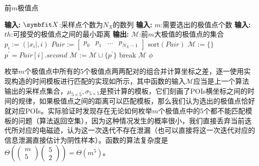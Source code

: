 {{	\begin{breakablealgorithm}
		\caption{前$m$极值点}\label{alg:maxpoint}
		\begin{algorithmic}[1]
			\Statex \textbf{输入:} $\Vector X$:采样点个数为$N_X$的数列
			\Statex \textbf{输入:} $m$:需要选出的极值点个数
			\Statex \textbf{输入:} $th$:可接受的极值点之间的最小距离
			\Statex \textbf{输出:} $\mathcal M$:前$m$大极值的极值点的集合
			\State $p_i:=(\vert x_i\vert,i)$
			\EndFor
			\State $Pair:=\begin{bmatrix}p_0&p_1&\ldots&p_{N_X-1}\end{bmatrix}$
			\State $\mathrm{sort}(Pair)$
			\State $\mathcal M:=\{\}$
			\State $p^\prime=Pair[i].second$
			\State $\mathcal M:=\mathcal M\cup\{p^\prime\}$
			\State break
			\EndIf
			\EndIf
			\EndFor
			\State \Return $\mathcal M$
			\Else
			\State \Return $\phi$
			\EndIf
		\end{algorithmic}
	\end{breakablealgorithm}
	
	枚举$m$个极值点中所有的5个极值点两两配对的组合并计算坐标之差，逐一使用实现构造的时间模板进行匹配的实现如所示，其中函数的输入$\mathcal M$应当是上一个算法输出的采样点集合，$\mu_{5\times5},\sigma_{5\times5}$是预计算的模板，它们刻画了POIs横坐标之间的时间的规律，如果极值点之间的距离可以匹配模板，那么我们认为选出的极值点恰好就对应POIs。实际验证时发现存在无论如何枚举$m$个极值点中的5个都不能匹配模板的问题（算法返回空集），因为这种情况发生的概率很小，我们直接丢弃当前迭代所对应的电磁迹，认为这一次迭代不存在泄漏（也可以直接将这一次迭代对应的信息泄漏直接估计为阴性样本）。函数的算法复杂度是$\Theta\left( \begin{pmatrix}m\\5\end{pmatrix}\begin{pmatrix}5\\2\end{pmatrix}\right) =\Theta(m^5)$。
	
}}
